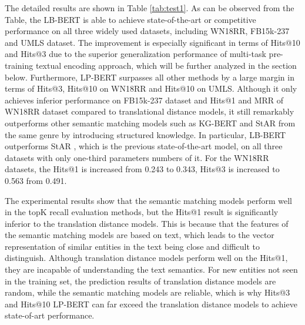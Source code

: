 \documentclass[journal]{IEEEtran}
\begin{document}
The detailed results are shown in Table \ref{tab:test1}. As can be observed from the Table, the LB-BERT is able to achieve state-of-the-art or competitive performance on all three widely used datasets, including WN18RR, FB15k-237 and UMLS dataset. The improvement is especially significant in terms of Hits@10 and Hits@3 due to the superior generalization performance of multi-task pre-training textual encoding approach, which will be further analyzed in the section below. Furthermore, LP-BERT surpasses all other methods by a large margin in terms of Hits@3, Hits@10 on WN18RR and Hits@10 on UMLS. Although it only achieves inferior performance on FB15k-237 dataset and Hits@1 and MRR of WN18RR dataset compared to translational distance models, it still remarkably outperforms other semantic matching models such as KG-BERT and StAR from the same genre by introducing structured knowledge. In particular, LB-BERT outperforms StAR \cite{wang2021structure}, which is the previous state-of-the-art model, on all three datasets with only one-third parameters numbers of it. For the WN18RR datasets, the Hits@1 is increased from 0.243 to 0.343, Hits@3 is increased to 0.563 from 0.491.




The experimental results show that the semantic matching models perform well in the topK recall evaluation methods, but the Hits@1 result is significantly inferior to the translation distance models. This is because that the features of the semantic matching models are based on text, which leads to the vector representation of similar entities in the text being close and difficult to distinguish. Although translation distance models perform well on the Hits@1, they are incapable of understanding the text semantics. For new entities not seen in the training set, the prediction results of translation distance models are random, while the semantic matching models are reliable, which is why Hits@3 and Hits@10 LP-BERT can far exceed the translation distance models to achieve state-of-art performance.
\end{document}
